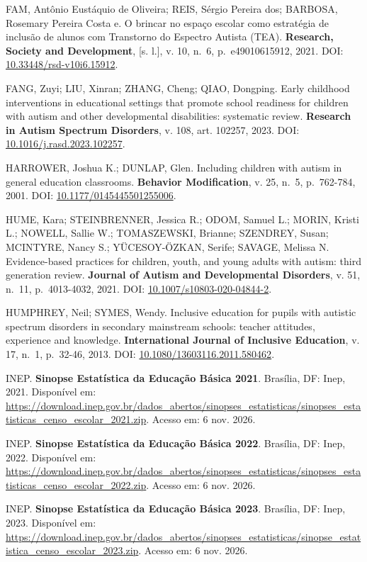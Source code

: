 FAM, Antônio Eustáquio de Oliveira; REIS, Sérgio Pereira dos; BARBOSA,
Rosemary Pereira Costa e. O brincar no espaço escolar como estratégia de
inclusão de alunos com Transtorno do Espectro Autista (TEA).
\textbf{Research, Society and Development}, {[}s. l.{]}, v. 10, n.~6,
p.~e49010615912, 2021. DOI: \url{10.33448/rsd-v10i6.15912}.

FANG, Zuyi; LIU, Xinran; ZHANG, Cheng; QIAO, Dongping. Early childhood
interventions in educational settings that promote school readiness for
children with autism and other developmental disabilities: systematic
review. \textbf{Research in Autism Spectrum Disorders}, v. 108, art.
102257, 2023. DOI: \url{10.1016/j.rasd.2023.102257}.

HARROWER, Joshua K.; DUNLAP, Glen. Including children with autism in
general education classrooms. \textbf{Behavior Modification}, v. 25,
n.~5, p.~762-784, 2001. DOI: \url{10.1177/0145445501255006}.

HUME, Kara; STEINBRENNER, Jessica R.; ODOM, Samuel L.; MORIN, Kristi L.;
NOWELL, Sallie W.; TOMASZEWSKI, Brianne; SZENDREY, Susan; MCINTYRE,
Nancy S.; YÜCESOY-ÖZKAN, Serife; SAVAGE, Melissa N. Evidence-based
practices for children, youth, and young adults with autism: third
generation review. \textbf{Journal of Autism and Developmental
Disorders}, v. 51, n.~11, p.~4013-4032, 2021. DOI:
\url{10.1007/s10803-020-04844-2}.

HUMPHREY, Neil; SYMES, Wendy. Inclusive education for pupils with
autistic spectrum disorders in secondary mainstream schools: teacher
attitudes, experience and knowledge. \textbf{International Journal of
Inclusive Education}, v. 17, n.~1, p.~32-46, 2013. DOI:
\url{10.1080/13603116.2011.580462}.

INEP. \textbf{Sinopse Estatística da Educação Básica 2021}. Brasília,
DF: Inep, 2021. Disponível em:
\url{https://download.inep.gov.br/dados_abertos/sinopses_estatisticas/sinopses_estatisticas_censo_escolar_2021.zip}.
Acesso em: 6 nov. 2026.

INEP. \textbf{Sinopse Estatística da Educação Básica 2022}. Brasília,
DF: Inep, 2022. Disponível em:
\url{https://download.inep.gov.br/dados_abertos/sinopses_estatisticas/sinopses_estatisticas_censo_escolar_2022.zip}.
Acesso em: 6 nov. 2026.

INEP. \textbf{Sinopse Estatística da Educação Básica 2023}. Brasília,
DF: Inep, 2023. Disponível em:
\url{https://download.inep.gov.br/dados_abertos/sinopses_estatisticas/sinopse_estatistica_censo_escolar_2023.zip}.
Acesso em: 6 nov. 2026.

